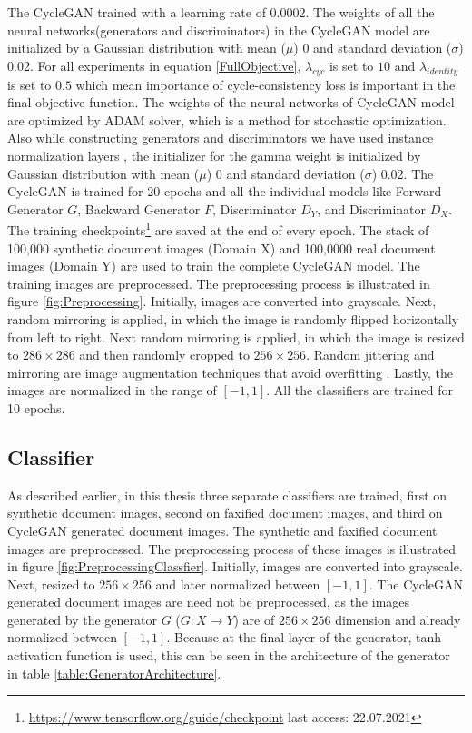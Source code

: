 The \ac{CycleGAN} trained with a learning rate of $0.0002$. The weights of all the neural networks(generators and discriminators) in the \ac{CycleGAN} model are initialized by a Gaussian distribution with mean ($\mu$) 0 and standard deviation ($\sigma$) 0.02. For all experiments in equation \ref{FullObjective}, $\lambda_{cyc}$ is set to $10$ and $\lambda_{identity}$ is set to $0.5$ which mean importance of cycle-consistency loss is important in the final objective function. The weights of the neural networks of \ac{CycleGAN} model are optimized by ADAM solver, which is a method for stochastic optimization\cite{kingma2017adam}. Also while constructing generators and discriminators we have used instance normalization layers \cite{ulyanov2017instance}, the initializer for the gamma weight is initialized by Gaussian distribution with mean ($\mu$) 0 and standard deviation ($\sigma$) 0.02. The \ac{CycleGAN} is trained for 20 epochs and all the individual models like Forward Generator $G$, Backward Generator $F$, Discriminator $D_Y$, and Discriminator $D_X$. The training checkpoints\footnote{\url{https://www.tensorflow.org/guide/checkpoint} last access: 22.07.2021} are saved at the end of every epoch. The stack of 100,000 synthetic document images (Domain X) and 100,0000 real document images (Domain Y) are used to train the complete \ac{CycleGAN} model. The training images are preprocessed. The preprocessing process is illustrated in figure \ref{fig:Preprocessing}. Initially, images are converted into grayscale. Next, random mirroring is applied, in which the image is randomly flipped horizontally from left to right. Next random mirroring is applied, in which the image is resized to $286 \times 286$ and then randomly cropped to $256 \times 256$. Random jittering and mirroring are image augmentation techniques that avoid overfitting \cite{zhu2020unpaired}. Lastly, the images are normalized in the range of $[-1, 1]$. All the classifiers are trained for 10 epochs.



\subsection{Classifier}

As described earlier, in this thesis three separate classifiers are trained, first on synthetic document images, second on faxified document images, and third on \ac{CycleGAN} generated document images. The synthetic and faxified document images are preprocessed. The preprocessing process of these images is illustrated in figure \ref{fig:PreprocessingClassfier}. Initially, images are converted into grayscale. Next, resized to $256 \times 256$ and later normalized between $[-1, 1]$. The \ac{CycleGAN} generated document images are need not be preprocessed, as the images generated by the generator $G$ ($G : X \rightarrow Y$) are of $256 \times 256$ dimension and already normalized between $[-1, 1]$. Because at the final layer of the generator, tanh activation function is used, this can be seen in the architecture of the generator in table \ref{table:GeneratorArchitecture}.

